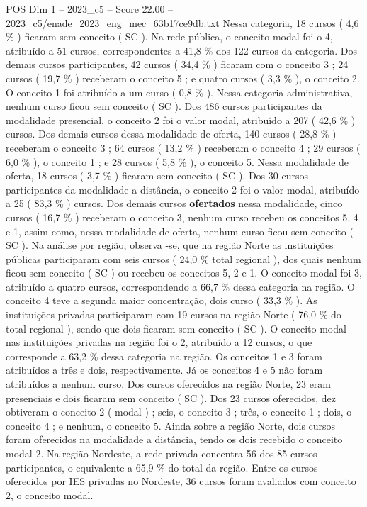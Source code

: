 \begin{textsample}{POS Dim 1 – 2023\_c5 – Score 22.00 – 2023\_c5/enade\_2023\_eng\_mec\_63b17ce9db.txt}
Nessa categoria, 18 cursos ( 4,6 \% ) ficaram sem conceito ( SC ).
Na rede pública, o conceito modal foi o 4, atribuído a 51 cursos, correspondentes a 41,8 \% dos 122 cursos da categoria.
Dos demais cursos participantes, 42 cursos ( 34,4 \% ) ficaram com o conceito 3 ; 24 cursos ( 19,7 \% ) receberam o conceito 5 ; e quatro cursos ( 3,3 \% ), o conceito 2.
O conceito 1 foi atribuído a um curso ( 0,8 \% ).
Nessa categoria administrativa, nenhum curso ficou sem conceito ( SC ).
Dos 486 cursos participantes da modalidade presencial, o conceito 2 foi o valor modal, atribuído a 207 ( 42,6 \% ) cursos.
Dos demais cursos dessa modalidade de oferta, 140 cursos ( 28,8 \% ) receberam o conceito 3 ; 64 cursos ( 13,2 \% ) receberam o conceito 4 ; 29 cursos ( 6,0 \% ), o conceito 1 ; e 28 cursos ( 5,8 \% ), o conceito 5.
Nessa modalidade de oferta, 18 cursos ( 3,7 \% ) ficaram sem conceito ( SC ).
Dos 30 cursos participantes da modalidade a distância, o conceito 2 foi o valor modal, atribuído a 25 ( 83,3 \% ) cursos.
Dos demais cursos \textbf{ofertados} nessa modalidade, cinco cursos ( 16,7 \% ) receberam o conceito 3, nenhum curso recebeu os conceitos 5, 4 e 1, assim como, nessa modalidade de oferta, nenhum curso ficou sem conceito ( SC ).
Na análise por região, observa -se, que na região Norte as instituições públicas participaram com seis cursos ( 24,0 \% total regional ), dos quais nenhum ficou sem conceito ( SC ) ou recebeu os conceitos 5, 2 e 1.
O conceito modal foi 3, atribuído a quatro cursos, correspondendo a 66,7 \% dessa categoria na região.
O conceito 4 teve a segunda maior concentração, dois curso ( 33,3 \% ).
As instituições privadas participaram com 19 cursos na região Norte ( 76,0 \% do total regional ), sendo que dois ficaram sem conceito ( SC ).
O conceito modal nas instituições privadas na região foi o 2, atribuído a 12 cursos, o que corresponde a 63,2 \% dessa categoria na região.
Os conceitos 1 e 3 foram atribuídos a três e dois, respectivamente.
Já os conceitos 4 e 5 não foram atribuídos a nenhum curso.
Dos cursos oferecidos na região Norte, 23 eram presenciais e dois ficaram sem conceito ( SC ).
Dos 23 cursos oferecidos, dez obtiveram o conceito 2 ( modal ) ; seis, o conceito 3 ; três, o conceito 1 ; dois, o conceito 4 ; e nenhum, o conceito 5.
Ainda sobre a região Norte, dois cursos foram oferecidos na modalidade a distância, tendo os dois recebido o conceito modal 2.
Na região Nordeste, a rede privada concentra 56 dos 85 cursos participantes, o equivalente a 65,9 \% do total da região.
Entre os cursos oferecidos por IES privadas no Nordeste, 36 cursos foram avaliados com conceito 2, o conceito modal.

\end{textsample}
